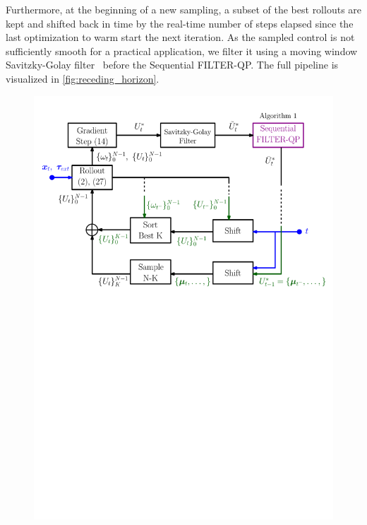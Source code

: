 Furthermore, at the beginning of a new sampling, a subset of the best rollouts are kept and shifted back in time by the real-time number of steps elapsed since the last optimization to warm start the next iteration. 
As the sampled control is not sufficiently smooth for a practical application, we filter it using a moving window Savitzky-Golay filter~\cite{gorry1990general} before the Sequential FILTER-QP.  The full pipeline is visualized in \fig \ref{fig:receding_horizon}.

\begin{figure}[t]
    \centering
    \includegraphics[width=\columnwidth]{figures/receding_horizon2.pdf}

\end{figure}
